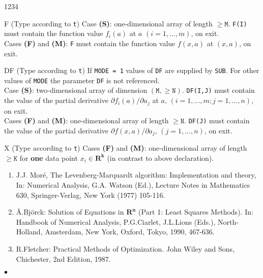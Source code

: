 \begin{DLtt}{1234}
\item[F] (Type according to {\tt t})
Case {\bf (S)}: one-dimensional array of length $\mathtt{\ge M}$.
  {\tt F(I)} must contain the function value
  $f_i(a)$ at $a$ $(i=1, \ldots ,m)$, on exit. \\
Cases {\bf (F)} and {\bf (M)}:  {\tt F} must contain the function value
$f(x,a)$ at $(x,a)$, on exit.
\item[DF] (Type according to {\tt t}) If {\tt MODE = 1}     values of
{\tt DF} are supplied by {\tt SUB}. For other values of {\tt MODE} the
parameter {\tt DF} is not referenced. \\
Case {\bf (S)}: two-dimensional array of dimension $\mathtt{(M, \ge N)}$.
{\tt DF(I,J)} must contain the value of the partial derivative
  $\partial f_i(a) / \partial a_j $ at $a$,
  $(i=1, \ldots , m ; j=1, \ldots ,n)$, on exit. \\
Cases {\bf (F)} and {\bf (M)}: one-dimensional array of length
$\mathtt{ \ge N}$.
{\tt DF(J)} must contain the value of the partial   derivative
  $\partial f(x, a) / \partial a_j$, $(j=1, \ldots ,n)$,
  on exit.
\item[X] (Type according to {\tt t}) Cases {\bf (F)} and {\bf (M)}:
one-dimensional array of length $\mathtt{\ge K}$ for {\bf one}
data point $x_i \in \mathbf{R^k}$ (in contrast to above declaration).
\end{DLtt}

\Refer
\begin{enumerate}
\item J.J. Mor\'e, The Levenberg-Marquardt algorithm: Implementation
 and theory, In: Numerical Analysis, G.A. Watson (Ed.), Lecture Notes
 in Mathematics 630, Springer-Verlag, New York (1977) 105-116.
\item {\AA}.Bj\"orck: Solution of Equations in $\mathbf{R^n}$
(Part 1: Least Squares Methods).
      In: Handbook of Numerical Analysis,
      P.G.Ciarlet, J.L.Lions (Eds.),
      North-Holland, Amsterdam, New York, Oxford,
      Tokyo, 1990, 467-636.
\item R.Fletcher: Practical Methods of Optimization.
      John Wiley and Sons, Chichester, 2nd Edition, 1987.
\end{enumerate}
$\bullet$
